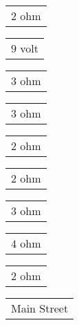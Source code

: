 \documentclass{book}
\begin{document}
\stopmpxshipout
\mpxshipout%
{\small \renewcommand{\arraystretch}{.9}
                \circuitfont\begin{tabular}[b]{@{}c}
                   $2$ ohm 
	        \end{tabular}}%
\stopmpxshipout
\mpxshipout%
{\small \renewcommand{\arraystretch}{.9}
                \circuitfont\begin{tabular}{@{}l}
                   $9$ volt 
	        \end{tabular}}%
\stopmpxshipout
\mpxshipout%
{\small \renewcommand{\arraystretch}{.9}
                \circuitfont\begin{tabular}[t]{@{}c}
                   $3$ ohm 
	        \end{tabular}}%
\stopmpxshipout
\mpxshipout%
{\small \renewcommand{\arraystretch}{.9}
                \circuitfont\begin{tabular}{@{}l}
                   $3$ ohm 
	        \end{tabular}}%
\stopmpxshipout
\mpxshipout%
{\small \renewcommand{\arraystretch}{.9}
                \circuitfont\begin{tabular}{@{}r}
                   $2$ ohm 
	        \end{tabular}}%
\stopmpxshipout
\mpxshipout%
{\small \renewcommand{\arraystretch}{.9}
                \circuitfont\begin{tabular}[b]{@{}c}
                   $2$ ohm 
	        \end{tabular}}%
\stopmpxshipout
\mpxshipout%
{\small \renewcommand{\arraystretch}{.9}
                \circuitfont\begin{tabular}[t]{@{}c}
                   $3$ ohm 
	        \end{tabular}}%
\stopmpxshipout
\mpxshipout%
{\small \renewcommand{\arraystretch}{.9}
                \circuitfont\begin{tabular}{@{}r}
                   $4$ ohm 
	        \end{tabular}}%
\stopmpxshipout
\mpxshipout%
{\small \renewcommand{\arraystretch}{.9}
                \circuitfont\begin{tabular}[b]{@{}c}
                   $2$ ohm 
	        \end{tabular}}%
\stopmpxshipout
\mpxshipout%
{\small \renewcommand{\arraystretch}{.9}
              \circuitfont\begin{tabular}[b]{@{}c@{}}
                  Main Street     
              \end{tabular}}%
\end{document}
